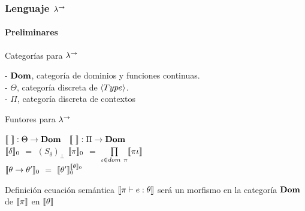 \documentclass{beamer}
\begin{document}
\begin{frame}
\frametitle{Lenguaje $\lambda^{\rightarrow}$}
\framesubtitle{Preliminares}

\begin{block}{Categorías para $\lambda^{\rightarrow}$}

- $\textbf{Dom}$, categoría de dominios y funciones continuas.\\
- $\Theta$, categoría discreta de $\langle Type \rangle$.\\
- $\Pi$, categoría discreta de contextos

\end{block}

\pause

\begin{block}{Funtores para $\lambda^{\rightarrow}$}

$\llbracket  \  \rrbracket : \Theta \rightarrow \textbf{Dom}$ 
\quad \quad \quad \
$\llbracket  \  \rrbracket : \Pi \rightarrow \textbf{Dom}$\\
$\llbracket \delta \rrbracket_0$ $=$ $(S_\delta)_\bot$
\quad \quad \quad \quad
$\llbracket \pi \rrbracket_0$ $=$ $\prod\limits_{\iota \in dom \ \pi} \llbracket \pi\iota \rrbracket$\\
$\llbracket \theta \rightarrow \theta' \rrbracket_0$ $=$ $\llbracket \theta' \rrbracket_0^{\llbracket \theta \rrbracket_0}$

\end{block}

\pause

\begin{block}{Definición ecuación semántica}
$\llbracket \pi \vdash e : \theta \rrbracket$ será un morfismo en la categoría $\textbf{Dom}$ de
$\llbracket \pi \rrbracket$ en $\llbracket \theta \rrbracket$
\end{block}

\end{frame}
\end{document}
